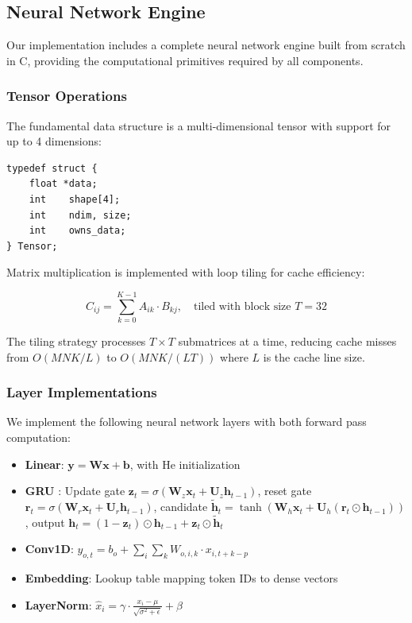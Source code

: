 \documentclass[conference]{IEEEtran}
\begin{document}
\subsection{Neural Network Engine}

Our implementation includes a complete neural network engine built from scratch in C, providing the computational primitives required by all components.

\subsubsection{Tensor Operations}

The fundamental data structure is a multi-dimensional tensor with support for up to 4 dimensions:

\begin{lstlisting}
typedef struct {
    float *data;
    int    shape[4];
    int    ndim, size;
    int    owns_data;
} Tensor;
\end{lstlisting}

Matrix multiplication is implemented with loop tiling for cache efficiency:

\begin{equation}
C_{ij} = \sum_{k=0}^{K-1} A_{ik} \cdot B_{kj}, \quad \text{tiled with block size } T=32
\label{eq:matmul}
\end{equation}

The tiling strategy processes $T \times T$ submatrices at a time, reducing cache misses from $O(MNK/L)$ to $O(MNK/(LT))$ where $L$ is the cache line size.

\subsubsection{Layer Implementations}

We implement the following neural network layers with both forward pass computation:

\begin{itemize}
\item \textbf{Linear}: $\mathbf{y} = \mathbf{W}\mathbf{x} + \mathbf{b}$, with He initialization \cite{he2015delving}
\item \textbf{GRU} \cite{cho2014gru}: Update gate $\mathbf{z}_t = \sigma(\mathbf{W}_z\mathbf{x}_t + \mathbf{U}_z\mathbf{h}_{t-1})$, reset gate $\mathbf{r}_t = \sigma(\mathbf{W}_r\mathbf{x}_t + \mathbf{U}_r\mathbf{h}_{t-1})$, candidate $\tilde{\mathbf{h}}_t = \tanh(\mathbf{W}_h\mathbf{x}_t + \mathbf{U}_h(\mathbf{r}_t \odot \mathbf{h}_{t-1}))$, output $\mathbf{h}_t = (1 - \mathbf{z}_t) \odot \mathbf{h}_{t-1} + \mathbf{z}_t \odot \tilde{\mathbf{h}}_t$
\item \textbf{Conv1D}: $y_{o,t} = b_o + \sum_{i} \sum_{k} W_{o,i,k} \cdot x_{i, t+k-p}$
\item \textbf{Embedding}: Lookup table mapping token IDs to dense vectors
\item \textbf{LayerNorm}: $\hat{x}_i = \gamma \cdot \frac{x_i - \mu}{\sqrt{\sigma^2 + \epsilon}} + \beta$
\end{itemize}
\end{document}
